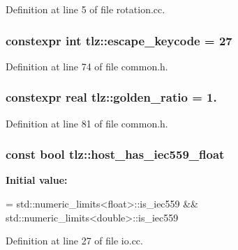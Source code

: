 Definition at line 5 of file rotation.\+cc.

\subsubsection[{\texorpdfstring{escape\+\_\+keycode}{escape_keycode}}]{\setlength{\rightskip}{0pt plus 5cm}constexpr int tlz\+::escape\+\_\+keycode = 27}\hypertarget{namespacetlz_a7ebc5d7ffd41d61b0d2ccda50d705fb4}{}\label{namespacetlz_a7ebc5d7ffd41d61b0d2ccda50d705fb4}


Definition at line 74 of file common.\+h.

\subsubsection[{\texorpdfstring{golden\+\_\+ratio}{golden_ratio}}]{\setlength{\rightskip}{0pt plus 5cm}constexpr {\bf real} tlz\+::golden\+\_\+ratio = 1.}\hypertarget{namespacetlz_a2c17d7f52299e459ae627624a0b35176}{}\label{namespacetlz_a2c17d7f52299e459ae627624a0b35176}


Definition at line 81 of file common.\+h.

\subsubsection[{\texorpdfstring{host\+\_\+has\+\_\+iec559\+\_\+float}{host_has_iec559_float}}]{\setlength{\rightskip}{0pt plus 5cm}const bool tlz\+::host\+\_\+has\+\_\+iec559\+\_\+float}\hypertarget{namespacetlz_a9cd815775329b5fc67db8e70937b5df5}{}\label{namespacetlz_a9cd815775329b5fc67db8e70937b5df5}
{\bfseries Initial value\+:}
\begin{DoxyCode}
=
    std::numeric\_limits<float>::is\_iec559 && std::numeric\_limits<double>::is\_iec559
\end{DoxyCode}


Definition at line 27 of file io.\+cc.

